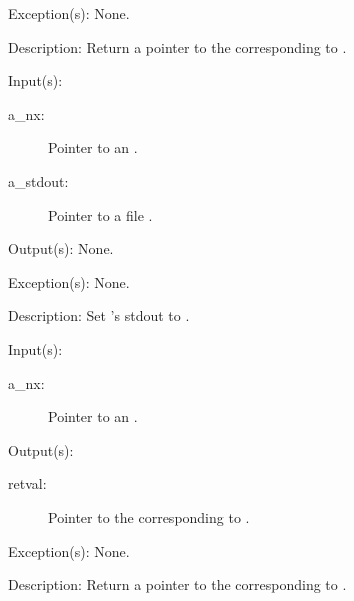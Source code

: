 \begin{capi}
\begin{capilist}
	\item[Exception(s): ] None.
	\item[Description: ]
		Return a pointer to the  corresponding to
		.
	\end{capilist}
\label{nx_stdout_set}
	\begin{capilist}
	\item[Input(s): ]
		\begin{description}\item[]
		\item[a\_nx: ]
			Pointer to an .
		\item[a\_stdout: ]
			Pointer to a file .
		\end{description}
	\item[Output(s): ] None.
	\item[Exception(s): ] None.
	\item[Description: ]
		Set 's stdout to .
	\end{capilist}
\label{nx_stderr_get}
	\begin{capilist}
	\item[Input(s): ]
		\begin{description}\item[]
		\item[a\_nx: ]
			Pointer to an \classname{nx}.
		\end{description}
	\item[Output(s): ]
		\begin{description}\item[]
		\item[retval: ]
			Pointer to the  corresponding to
			\onyxop{stderr}{}.
		\end{description}
	\item[Exception(s): ] None.
	\item[Description: ]
		Return a pointer to the  corresponding to
		\onyxop{stderr}{}.
	\end{capilist}
\label{nx_stderr_set}
	\begin{capilist}

\end{capilist}
\end{capi}
